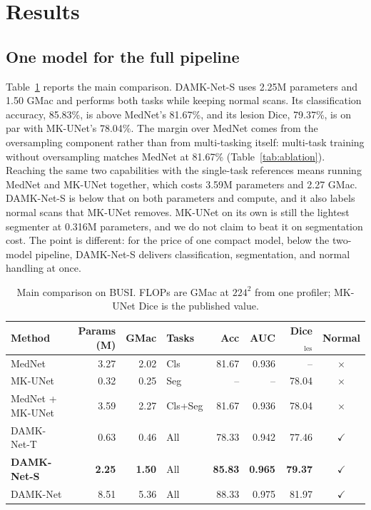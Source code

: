 \documentclass[runningheads]{llncs}
\newcommand{\cmark}{\ensuremath{\checkmark}}
\newcommand{\xmark}{\ensuremath{\times}}
\begin{document}
\section{Results}
\label{sec:results}
\subsection{One model for the full pipeline}
Table~\ref{tab:main} reports the main comparison. DAMK-Net-S uses 2.25M
parameters and 1.50 GMac and performs both tasks while keeping normal scans. Its
classification accuracy, 85.83\%, is above MedNet's 81.67\%, and its lesion Dice,
79.37\%, is on par with MK-UNet's 78.04\%. The margin over MedNet comes from the
oversampling component rather than from multi-tasking itself: multi-task training
without oversampling matches MedNet at 81.67\% (Table~\ref{tab:ablation}).
Reaching the same two capabilities with the single-task references means running
MedNet and MK-UNet together, which costs 3.59M parameters and 2.27 GMac.
DAMK-Net-S is below that on both parameters and compute, and it also labels normal
scans that MK-UNet removes. MK-UNet on its own is still the lightest segmenter at
0.316M parameters, and we do not claim to beat it on segmentation cost. The point
is different: for the price of one compact model, below the two-model pipeline,
DAMK-Net-S delivers classification, segmentation, and normal handling at once.

\begin{table}[t]
\caption{Main comparison on BUSI. FLOPs are GMac at $224^2$ from one profiler;
MK-UNet Dice is the published value.}
\label{tab:main}
\centering
\begin{tabular}{lrrlrrrc}
\toprule
Method & Params (M) & GMac & Tasks & Acc & AUC & Dice$_{\text{les}}$ & Normal \\
\midrule
MedNet            & 3.27 & 2.02 & Cls     & 81.67 & 0.936 & --    & \xmark \\
MK-UNet           & 0.32 & 0.25 & Seg     & --    & --    & 78.04 & \xmark \\
MedNet + MK-UNet  & 3.59 & 2.27 & Cls+Seg & 81.67 & 0.936 & 78.04 & \xmark \\
DAMK-Net-T        & 0.63 & 0.46 & All     & 78.33 & 0.942 & 77.46 & \cmark \\
\textbf{DAMK-Net-S} & \textbf{2.25} & \textbf{1.50} & All & \textbf{85.83} & \textbf{0.965} & \textbf{79.37} & \cmark \\
DAMK-Net          & 8.51 & 5.36 & All     & 88.33 & 0.975 & 81.97 & \cmark \\
\bottomrule
\end{tabular}
\end{table}
\end{document}
